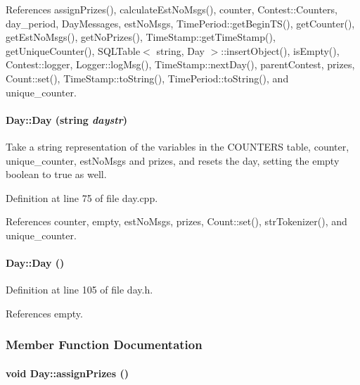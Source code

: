 References assign\-Prizes(), calculate\-Est\-No\-Msgs(), counter, Contest::Counters, day\_\-period, Day\-Messages, est\-No\-Msgs, Time\-Period::get\-Begin\-TS(), get\-Counter(), get\-Est\-No\-Msgs(), get\-No\-Prizes(), Time\-Stamp::get\-Time\-Stamp(), get\-Unique\-Counter(), SQLTable$<$ string, Day $>$::insert\-Object(), is\-Empty(), Contest::logger, Logger::log\-Msg(), Time\-Stamp::next\-Day(), parent\-Contest, prizes, Count::set(), Time\-Stamp::to\-String(), Time\-Period::to\-String(), and unique\_\-counter.\hypertarget{classDay_Daya1}{
\paragraph[Day]{\setlength{\rightskip}{0pt plus 5cm}Day::Day (string {\em daystr})}\hfill}
\label{classDay_Daya1}


Take a string representation of the variables in the COUNTERS table, counter, unique\_\-counter, est\-No\-Msgs and prizes, and resets the day, setting the empty boolean to true as well. 

Definition at line 75 of file day.cpp.

References counter, empty, est\-No\-Msgs, prizes, Count::set(), str\-Tokenizer(), and unique\_\-counter.\hypertarget{classDay_Daya2}{
\paragraph[Day]{\setlength{\rightskip}{0pt plus 5cm}Day::Day ()}\hfill}
\label{classDay_Daya2}




Definition at line 105 of file day.h.

References empty.

\subsubsection{Member Function Documentation}
\hypertarget{classDay_Daya5}{
\paragraph[assignPrizes]{\setlength{\rightskip}{0pt plus 5cm}void Day::assign\-Prizes ()}\hfill}
\label{classDay_Daya5}


